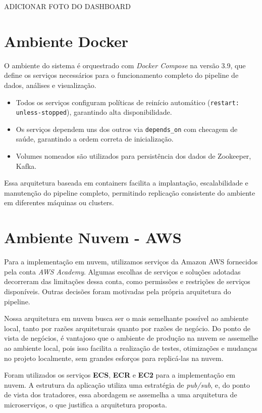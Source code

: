 \documentclass[a4paper,12pt]{article}
\begin{document}
ADICIONAR FOTO DO DASHBOARD


\section{Ambiente Docker}

O ambiente do sistema é orquestrado com \textit{Docker Compose} na versão 3.9, que define os serviços necessários para o funcionamento completo do pipeline de dados, análises e visualização.


\begin{itemize}
    \item Todos os serviços configuram políticas de reinício automático (\texttt{restart: unless-stopped}), garantindo alta disponibilidade.
    \item Os serviços dependem uns dos outros via \texttt{depends\_on} com checagem de saúde, garantindo a ordem correta de inicialização.
    \item Volumes nomeados são utilizados para persistência dos dados de Zookeeper, Kafka.
\end{itemize}

Essa arquitetura baseada em containers facilita a implantação, escalabilidade e manutenção do pipeline completo, permitindo replicação consistente do ambiente em diferentes máquinas ou clusters.


\section{Ambiente Nuvem - AWS}

Para a implementação em nuvem, utilizamos serviços da Amazon AWS fornecidos pela conta \textit{AWS Academy}. Algumas escolhas de serviços e soluções adotadas decorreram das limitações dessa conta, como permissões e restrições de serviços disponíveis. Outras decisões foram motivadas pela própria arquitetura do pipeline.

Nossa arquitetura em nuvem busca ser o mais semelhante possível ao ambiente local, tanto por razões arquiteturais quanto por razões de negócio. Do ponto de vista de negócios, é vantajoso que o ambiente de produção na nuvem se assemelhe ao ambiente local, pois isso facilita a realização de testes, otimizações e mudanças no projeto localmente, sem grandes esforços para replicá-las na nuvem.

Foram utilizados os serviços \textbf{ECS}, \textbf{ECR} e \textbf{EC2} para a implementação em nuvem. A estrutura da aplicação utiliza uma estratégia de \textit{pub/sub}, e, do ponto de vista dos tratadores, essa abordagem se assemelha a uma arquitetura de microserviços, o que justifica a arquitetura proposta.
\end{document}
